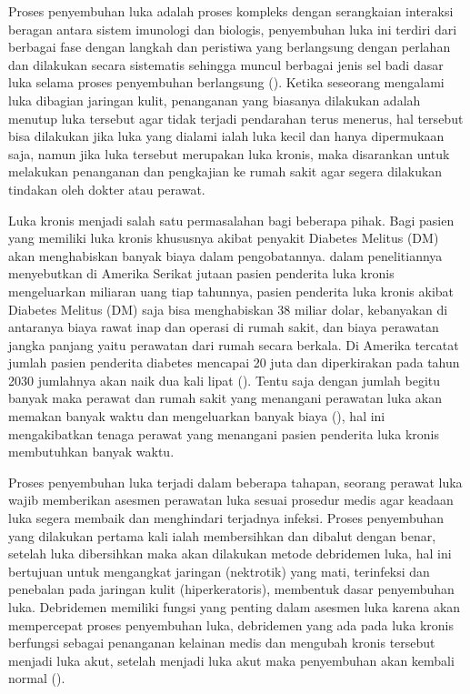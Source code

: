 Proses penyembuhan luka adalah proses kompleks dengan serangkaian interaksi beragan 
antara sistem imunologi dan biologis, penyembuhan luka ini terdiri dari berbagai 
fase dengan langkah dan peristiwa yang berlangsung dengan perlahan dan dilakukan 
secara sistematis sehingga muncul berbagai jenis sel badi dasar luka selama proses 
penyembuhan berlangsung (\cite{Velnar:2009}). Ketika seseorang mengalami luka 
dibagian jaringan kulit, penanganan yang biasanya dilakukan adalah menutup luka 
tersebut agar tidak terjadi pendarahan terus menerus, hal tersebut bisa dilakukan 
jika luka yang dialami ialah luka kecil dan hanya dipermukaan saja, namun jika luka 
tersebut merupakan luka kronis, maka disarankan untuk melakukan penanganan dan pengkajian 
ke rumah sakit agar segera dilakukan tindakan oleh dokter atau perawat.  


Luka kronis menjadi salah satu permasalahan bagi beberapa pihak. Bagi pasien yang 
memiliki luka kronis khususnya akibat penyakit Diabetes Melitus (DM) akan menghabiskan 
banyak biaya dalam pengobatannya. \cite{Wang:2015} dalam penelitiannya menyebutkan 
di Amerika Serikat jutaan pasien penderita luka kronis mengeluarkan miliaran uang 
tiap tahunnya,  pasien penderita luka kronis akibat Diabetes Melitus (DM) saja bisa 
menghabiskan 38 miliar dolar, kebanyakan di antaranya biaya rawat inap dan operasi di 
rumah sakit, dan biaya perawatan jangka panjang yaitu perawatan dari rumah secara 
berkala. Di Amerika tercatat jumlah pasien penderita diabetes mencapai 20 juta dan 
diperkirakan pada tahun 2030 jumlahnya akan naik dua kali lipat (\cite{Han:2017}). 
Tentu saja dengan jumlah begitu banyak maka perawat dan rumah sakit yang menangani 
perawatan luka akan memakan banyak waktu  dan mengeluarkan banyak biaya (\cite{Wang:2015}), 
hal ini mengakibatkan tenaga perawat yang menangani pasien penderita luka kronis 
membutuhkan banyak waktu. 


Proses penyembuhan luka terjadi dalam beberapa tahapan, seorang perawat luka wajib 
memberikan asesmen perawatan luka sesuai prosedur medis agar keadaan luka segera 
membaik dan menghindari terjadnya infeksi. Proses penyembuhan yang dilakukan pertama 
kali ialah membersihkan dan dibalut dengan benar, setelah luka dibersihkan maka 
akan dilakukan metode debridemen luka, hal ini bertujuan untuk mengangkat jaringan 
(nektrotik) yang mati, terinfeksi dan penebalan pada jaringan kulit (hiperkeratoris), 
membentuk dasar penyembuhan luka. Debridemen memiliki fungsi yang penting dalam 
asesmen luka karena akan mempercepat proses penyembuhan luka, debridemen yang ada 
pada luka kronis berfungsi sebagai penanganan kelainan medis dan mengubah kronis 
tersebut menjadi luka akut, setelah menjadi luka akut maka penyembuhan akan kembali 
normal (\cite{Velnar:2009}).


